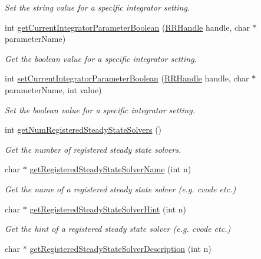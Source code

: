 \begin{DoxyCompactItemize}
\begin{DoxyCompactList}\small\item\em Set the string value for a specific integrator setting. \end{DoxyCompactList}\item 
int \hyperlink{group__simopts_gab06f6ef3c9c6b57a2806132b1906a52e}{get\+Current\+Integrator\+Parameter\+Boolean} (\hyperlink{rrc__types_8h_a1d68f0592372208fa5a5f2799ea4b3ae}{R\+R\+Handle} handle, char $\ast$parameter\+Name)
\begin{DoxyCompactList}\small\item\em Get the boolean value for a specific integrator setting. \end{DoxyCompactList}\item 
int \hyperlink{group__simopts_gab89192771385f30f5223756c46bda227}{set\+Current\+Integrator\+Parameter\+Boolean} (\hyperlink{rrc__types_8h_a1d68f0592372208fa5a5f2799ea4b3ae}{R\+R\+Handle} handle, char $\ast$parameter\+Name, int value)
\begin{DoxyCompactList}\small\item\em Set the boolean value for a specific integrator setting. \end{DoxyCompactList}\item 
int \hyperlink{group__simopts_ga210bf6ea10e2c17023a4f108833680e7}{get\+Num\+Registered\+Steady\+State\+Solvers} ()
\begin{DoxyCompactList}\small\item\em Get the number of registered steady state solvers. \end{DoxyCompactList}\item 
char $\ast$ \hyperlink{group__simopts_gae4dfba532a52cfdd6011355a2a48fdd0}{get\+Registered\+Steady\+State\+Solver\+Name} (int n)
\begin{DoxyCompactList}\small\item\em Get the name of a registered steady state solver (e.\+g. cvode etc.) \end{DoxyCompactList}\item 
char $\ast$ \hyperlink{group__simopts_gaf6ac4275f7bc0967d420f15377b189a6}{get\+Registered\+Steady\+State\+Solver\+Hint} (int n)
\begin{DoxyCompactList}\small\item\em Get the hint of a registered steady state solver (e.\+g. cvode etc.) \end{DoxyCompactList}\item 
char $\ast$ \hyperlink{group__simopts_ga090a38a435c4819945e8fc7724ff68f2}{get\+Registered\+Steady\+State\+Solver\+Description} (int n)

\end{DoxyCompactItemize}
